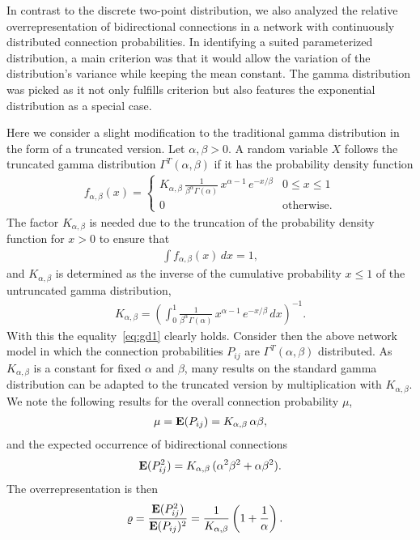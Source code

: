 
In contrast to the discrete two-point distribution, we also analyzed the relative overrepresentation of bidirectional connections in a network with continuously distributed connection probabilities. In identifying a suited parameterized distribution, a main criterion was that it would allow the variation of the distribution's variance while keeping the mean constant. The gamma distribution was picked as it not only fulfills criterion but also features the exponential distribution as a special case.

Here we consider a slight modification to the traditional gamma distribution in the form of a truncated version. Let $\alpha, \beta > 0$. A random variable $X$ follows the truncated gamma distribution $\Gamma^T(\alpha, \beta)$ if it has the probability density function 
%
\begin{align}
  f_{\alpha,\beta}(x) = \begin{cases} K_{\alpha, \beta}\,
\frac{1}{\beta^{\alpha}\Gamma(\alpha)}\, x^{\alpha-1}\,e^{-x/\beta} & 0 \leq x \leq 1 \\
0 & \text{otherwise}.
\end{cases}
\end{align}
%
The factor $K_{\alpha,\beta}$ is needed due to the truncation of the probability density function for $x>0$ to ensure that
\begin{align}
  \int f_{\alpha,\beta}(x) \,dx = 1 \label{eq:gd1},
\end{align}
and $K_{\alpha,\beta}$ is determined as the inverse of the cumulative probability $x \leq 1$ of the untruncated gamma distribution,
\begin{align}
  K_{\alpha,\beta} = \left(\int_0^{1} \frac{1}{\beta^{\alpha}\Gamma(\alpha)}\, x^{\alpha-1}\,e^{-x/\beta} \, dx \right)^{-1}.
\end{align}
With this the equality~\eqref{eq:gd1} clearly holds. Consider then the above network model in which the connection probabilities $P_{ij}$ are $\Gamma^T(\alpha, \beta)$ distributed. As $K_{\alpha,\beta}$ is a constant for fixed $\alpha$ and $\beta$, many results on the standard gamma distribution can be adapted to the truncated version by multiplication with $K_{\alpha,\beta}$. We note the following results for the overall connection probability $\mu$,
%
\begin{align}
 \mu = \operatorname{\mathbf{E}}(P_{ij}) = K_{\alpha,\beta} \, \alpha \beta, \label{eq:gd3}
\end{align}
and the expected occurrence of bidirectional connections
\begin{align}
  \operatorname{\mathbf{E}}(P_{ij}^2) = K_{\alpha,\beta} \, (\alpha^2 \beta^2 + \alpha \beta^2).
\end{align}
%
The overrepresentation is then
\begin{align}
  \varrho & = \frac{\E(P_{ij}^2)}{\E(P_{ij})^2} =%
 \frac{1}{K_{\alpha,\beta}} \left(1 + \frac{1}{\alpha}\right).
\end{align}

